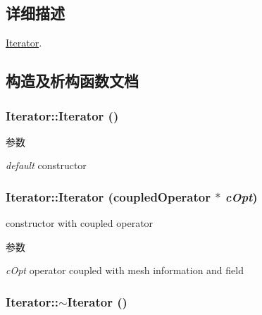 \subsection{详细描述}
\hyperlink{classIterator}{Iterator}. 

\subsection{构造及析构函数文档}
\hypertarget{classIterator_a30f4489aebb0ea1a56da6925d03eecfb}{
\subsubsection[{Iterator}]{\setlength{\rightskip}{0pt plus 5cm}Iterator::Iterator ()}}
\label{classIterator_a30f4489aebb0ea1a56da6925d03eecfb}

\begin{DoxyParams}{参数}
\item[{\em default}]constructor \end{DoxyParams}
\hypertarget{classIterator_aef11e42fab332c1ef29187d4c7ab2b6c}{
\subsubsection[{Iterator}]{\setlength{\rightskip}{0pt plus 5cm}Iterator::Iterator (coupledOperator $\ast$ {\em cOpt})}}
\label{classIterator_aef11e42fab332c1ef29187d4c7ab2b6c}


constructor with coupled operator 
\begin{DoxyParams}{参数}
\item[{\em cOpt}]operator coupled with mesh information and field \end{DoxyParams}
\hypertarget{classIterator_aab6716f5bdecb49e9cdd754359408ab6}{
\subsubsection[{$\sim$Iterator}]{\setlength{\rightskip}{0pt plus 5cm}Iterator::$\sim$Iterator ()}}
\label{classIterator_aab6716f5bdecb49e9cdd754359408ab6}

